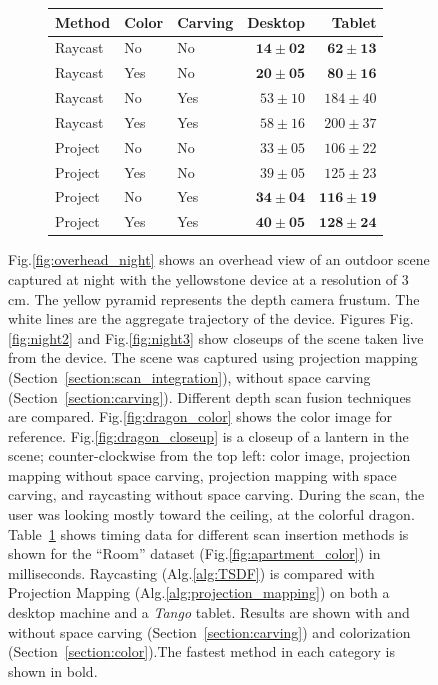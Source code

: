 \documentclass[conference]{IEEEtran}
\newcommand{\sref}[1]{Section~\ref{#1}}
\newcommand{\figref}[1]{Fig.\ref{#1}}
\newcommand{\tabref}[1]{Table~\ref{#1}}
\newcommand{\algoref}[1]{Alg.\ref{#1}}
\begin{document}
\begin{figure} [htb]
\begin{subfigure}{0.35\linewidth}
\begin{tabular} { | l | l | l | r | r |}
			\hline
			Method       & Color & Carving & Desktop& Tablet\\
			\hline 
			Raycast & No& No&$\mathbf{14 \pm 02}$ & $\mathbf{62 \pm 13}$ \\ \hline
			Raycast & Yes & No& $\mathbf{20 \pm 05}$ & $\mathbf{80 \pm 16}$ \\ \hline
			Raycast & No & Yes & $53 \pm  10$ & $184 \pm 40$ \\ \hline
			Raycast & Yes & Yes &$58 \pm 16$  & $200 \pm 37$\\ \hline \hline
			Project & No & No & $33 \pm 05$ & $106 \pm 22$ \\ \hline
			Project & Yes & No & $39 \pm 05$  & $125 \pm 23$ \\ \hline
			Project  & No & Yes & $\mathbf{34 \pm 04}$  & $\mathbf{116 \pm 19}$ \\ \hline
			Project & Yes & Yes  & $\mathbf{40 \pm 05}$ & $\mathbf{128 \pm 24}$ \\ \hline
			\end{tabular}
			\caption{}
			\label{table:timing}
	 \end{subfigure} 
	 \caption{\figref{fig:overhead_night} shows an overhead view of
	 an outdoor scene captured at night with the yellowstone device at a
	 resolution of 3 cm. The yellow pyramid represents the depth camera frustum. The white
	 lines are the aggregate trajectory of the device. Figures \figref{fig:night2}
	 and \figref{fig:night3} show closeups of the scene taken live from the device.
	 The scene was captured using projection mapping
	 (\sref{section:scan_integration}), without space carving 
	 (\sref{section:carving}). Different depth scan fusion techniques are
	compared. \figref{fig:dragon_color} shows the color image for reference. 
	\figref{fig:dragon_closeup} is a closeup of a lantern in the scene; 
	 counter-clockwise from the top left: color image, projection mapping without
	 space carving, projection mapping with space carving, and raycasting without
	 space carving. During the scan, the user was looking mostly toward the
	 ceiling, at the colorful dragon. \tabref{table:timing} shows timing data
	 for different scan insertion methods is shown for the ``Room'' dataset (\figref{fig:apartment_color}) in milliseconds. Raycasting
			(\algoref{alg:TSDF}) is compared with Projection Mapping 
			(\algoref{alg:projection_mapping}) on both a desktop machine and a
			\textit{Tango} tablet. Results are shown with and without space carving (\sref{section:carving}) and colorization (\sref{section:color}).The fastest
			method in each category is shown in bold.}
	 \label{fig:device_data}
 \end{figure} 
\end{document}
